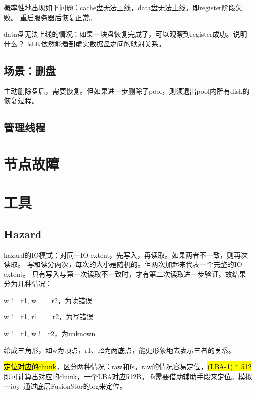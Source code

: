 概率性地出现如下问题：cache盘无法上线，data盘无法上线。即register阶段失败。
重启服务器后恢复正常。

data盘无法上线的情况：如果一块盘恢复完成了，可以观察到register成功。说明什么？
lsblk依然能看到虚实数据盘之间的映射关系。

\subsection{场景：删盘}

主动删除盘后，需要恢复。但如果进一步删除了pool，则须退出pool内所有disk的恢复过程。

\subsection{管理线程}

\section{节点故障}

\section{工具}

\subsection{Hazard}

hazard的IO模式：对同一IO extent，先写入，再读取。如果两者不一致，则再次读取。
写和读分两次，每次的大小是随机的。但两次加起来代表一个完整的IO extent。
只有写入与第一次读取不一致时，才有第二次读取进一步验证。故结果分为几种情况：
\begin{enumbox}
\item w != r1, w == r2，为读错误
\item w != r1, r1 == r2，为写错误
\item w != r1, w != r2，为unknown
\end{enumbox}

绘成三角形，如w为顶点，r1、r2为两底点，能更形象地去表示三者的关系。

\hl{定位对应的chunk}，区分两种情况：raw和fs。raw的情况容易定位，\hl{(LBA-1) * 512}即可计算出对应的chunk，一个LBA对应512B。
fs需要借助辅助手段来定位。模拟一io，通过底层FusionStor的log来定位。
